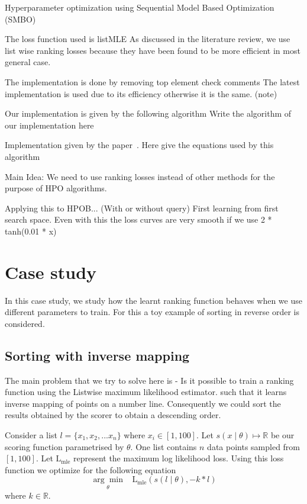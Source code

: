\documentclass[11pt]{report}
\begin{document}
Hyperparameter optimization using Sequential Model Based Optimization (SMBO)~\cite{NIPS2011_86e8f7ab}

The loss function used is listMLE
As discussed in the literature review,  we use list wise ranking losses because they have been found to be more efficient in most general case.

The implementation is done by removing top element check comments
The latest implementation is used due to its efficiency otherwise it is the same. (note)

Our implementation is given by the following algorithm
Write the algorithm of our implementation here

Implementation given by the paper~\cite{Pobrotyn2020ContextAwareLT}.
Here give the equations used by this algorithm

Main Idea:
    We need to use ranking losses instead of other methods for the purpose of HPO algorithms.


Applying this to HPOB... (With or without query)
    First learning from first search space.
    Even with this the loss curves are very smooth if we use 2 * tanh(0.01 * x)

    
\section{Case study}

In this case study,  we study how the learnt ranking function behaves when we use different parameters to train.
For this a toy example of sorting in reverse order is considered.


\subsection{Sorting with inverse mapping}
    
The main problem that we try to solve here is - Is it possible to train a ranking function using the Listwise maximum likelihood estimator. 
such that it learns inverse mapping of points on a number line.
Consequently we could sort the results obtained by the scorer to obtain a descending order.


Consider a list $l = \{x_1, x_2, ...x_n\}$ where $x_i \in [1, 100]$.
Let $s(x \mid \theta) \mapsto \mathbb{R}$ be our scoring function parametrised by $\theta$.
One list contains $n$ data points sampled from $[1, 100]$.
Let $\textrm{L}_{\textrm{mle}}$ represent the maximum log likelihood loss.
Using this loss function we optimize for the following equation
\begin{equation}
\underset{\theta}{\arg\min} \;\;\; \textrm{L}_{\textrm{mle}}(s(l \mid \theta),  - k * l)
\end{equation}
where $k \in \mathbb{R}$.
 
\end{document}
